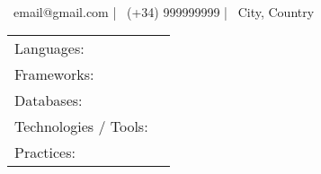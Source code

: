 \documentclass[]{awesome-cv}
\begin{document}
    
\begin{center}
	  \\
	\vspace{2mm}
	{\hspace{0.8cm}\faEnvelope\ email@gmail.com}  |  {\faMobile\ (+34) 999999999}  |  {\faMapMarker\ City, Country} 
\end{center}

\begin{cventries}
	\cventry
	{}
	{\def\arraystretch{1.15}{\begin{tabular}{ l l }
		Languages:  & {\skill{ Java, JavaScript, TypeScript, SQL, HTML, CSS}} \\
		Frameworks:  & {\skill{ Spring, Angular.}} \\
		Databases:  & {\skill{ MySQL, PostgreSQL (with PostGIS module), Neo4j, Oracle, SQLite.}} \\
		Technologies / Tools: \hspace{0.05cm} & {\skill{ Docker, Docker Swarm, Jenkins, RabbitMQ, Kafka, SonarQube, Maven, npm, Git.}} \\
		Practices:  & {\skill{ Agile, Scrum, SOLID Principles, Test-Driven Development, Code Reviews.}} \\
		\end{tabular}}}
	{}
	{}
	{}
\end{cventries}
\vspace{-7mm}
\end{document}
